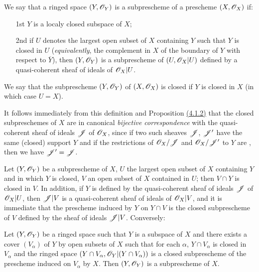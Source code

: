 \begin{defn}[4.1.3]
\label{defn-1.4.1.3}
We say that a ringed space $(Y,\mathscr{O}_Y)$ is a subprescheme of a prescheme $(X,\mathscr{O}_X)$ if:
\begin{itemize}
  \item[1st] $Y$ is a localy closed subspace of $X$;
  \item[2nd] if $U$ denotes the largest open subset of $X$ containing $Y$ such that
             $Y$ is closed in $U$ ({\it equivalently}, the complement in $X$ of the
             boundary of $Y$ with respect to $\overline{Y}$), then $(Y,\mathscr{O}_Y)$ is
             a subprescheme of $(U,\mathscr{O}_X|U)$ defined by a quasi-coherent sheaf of ideals of
             $\mathscr{O}_X|U$.
\end{itemize}
We say that the subprescheme $(Y,\mathscr{O}_Y)$ of $(X,\mathscr{O}_X)$ is closed if $Y$ is closed in $X$
(in which case $U=X$).
\end{defn}

It follows immediately from this definition and Proposition \hyperref[prop-1.4.1.2]{(4.1.2)}
that the closed subpreschemes of $X$ are in canonical {\it bijective correspondence} with the
quasi-coherent sheaf of ideals $\mathscr{J}$ of $\mathscr{O}_X$, since if two such sheaves
$\mathscr{J}$, $\mathscr{J}'$ have the same (closed) support $Y$ and if the restrictions of
$\mathscr{O}_X/\mathscr{J}$ and $\mathscr{O}_X/\mathscr{J}'$ to $Y$ are , then we have $\mathscr{J}'=\mathscr{J}$.

\begin{env}[4.1.4]
\label{env-1.4.1.4}
Let $(Y,\mathscr{O}_Y)$ be a subprescheme of $X$, $U$ the largest open subset of $X$ containing $Y$
and in which $Y$ is closed, $V$ an open subset of $X$ contained in $U$; then $V\cap Y$ is
closed in $V$. In addition, if $Y$ is defined by the quasi-coherent sheaf of ideals $\mathscr{J}$
of $\mathscr{O}_X|U$, then $\mathscr{J}|V$ is a quasi-coherent sheaf of ideals of $\mathscr{O}_X|V$, and it is
immediate that the prescheme induced by $Y$ on $Y\cap V$ is the closed subprescheme of $V$
defined by the sheaf of ideals $\mathscr{J}|V$. Conversely:
\end{env}

\begin{prop}[4.1.5]
\label{prop-1.4.1.5}
Let $(Y,\mathscr{O}_Y)$ be a ringed space such that $Y$ is a subspace of $X$ and there exists a
cover $(V_\alpha)$ of $Y$ by open subsets of $X$ such that for each $\alpha$,
$Y\cap V_\alpha$ is closed in $V_\alpha$ and the ringed space
$(Y\cap V_\alpha,\mathscr{O}_Y|(Y\cap V_\alpha))$ is a closed subprescheme of the prescheme induced
on $V_\alpha$ by $X$. Then $(Y,\mathscr{O}_Y)$ is a subprescheme of $X$.
\end{prop}

